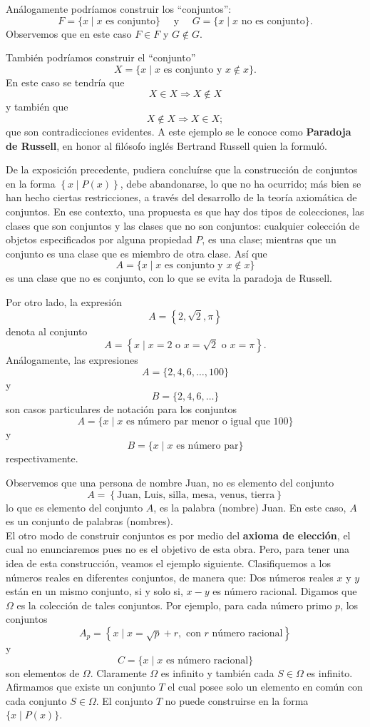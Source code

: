Análogamente podríamos construir los ``conjuntos'':
$$F = \{x \mid x \text{ es conjunto}\} \quad \text{ y } \quad G = \{x \mid x \text{ no es conjunto}\}.$$
Observemos que en este caso $F \in F$ y $G \notin G$.

También podríamos construir el ``conjunto''
$$X = \{x \mid x \text{ es conjunto y } x \notin x\}.$$
En este caso se tendría que
$$X \in X \Longrightarrow X \notin X$$
y también que
$$X \notin X \Longrightarrow X \in X;$$
que son contradicciones evidentes. A este ejemplo se le conoce como \textbf{Paradoja de Russell}, en honor al filósofo inglés Bertrand Russell quien la formuló.

De la exposición precedente, pudiera concluírse que la construcción de conjuntos en la forma $\left\{x \mid P(x) \right\}$, debe abandonarse, lo que no ha ocurrido; más bien se han hecho ciertas restricciones, a través del desarrollo de la teoría axiomática de conjuntos. En ese contexto, una propuesta es que hay dos tipos de colecciones, las clases que son conjuntos y las clases que no son conjuntos: cualquier colección de objetos especificados por alguna propiedad $P$, es una clase; mientras que un conjunto es una clase que es miembro de otra clase. Así que
$$A = \{x \mid x \text{ es conjunto y } x \notin x\}$$
es una clase que no es conjunto, con lo que se evita la paradoja de Russell.

Por otro lado, la expresión
$$A = \left\{2, \sqrt{2}, \pi \right\}$$
denota al conjunto
$$A = \left\{x \mid x = 2 \text { o } x = \sqrt{2} \text { o } x = \pi \right\}.$$
Análogamente, las expresiones
$$A = \{2, 4, 6, \dots, 100\}$$
y
$$B = \{2, 4, 6, \dots\}$$
son casos particulares de notación para los conjuntos
$$A = \{x \mid x \text { es número par menor o igual que } 100\}$$
y
$$B = \{x \mid x \text { es número par}\}$$
respectivamente.

Observemos que una persona de nombre Juan, no es elemento del conjunto
$$A = \left\{\text {Juan, Luis, silla, mesa, venus, tierra}\right\}$$\newpage\noindent
lo que es elemento del conjunto $A$, es la palabra (nombre) Juan. En este caso, $A$ es un conjunto de palabras (nombres). \\

El otro modo de construir conjuntos es por medio del \textbf{axioma de elección}, el cual no enunciaremos pues no es el objetivo de esta obra. Pero, para tener una idea de esta construcción, veamos el ejemplo siguiente. Clasifiquemos a los números reales en diferentes conjuntos, de manera que: Dos números reales $x$ y $y$ están en un mismo conjunto, si y solo si, $x - y$ es número racional. Digamos que $\Omega$ es la colección de tales conjuntos. Por ejemplo, para cada número primo $p$, los conjuntos
$$A_p = \left\{x \mid x = \sqrt{p}+r, \text { con } r \text { número racional} \right\}$$
y
$$C = \{x \mid x \text{ es número racional}\}$$
son elementos de $\Omega$. Claramente $\Omega$ es infinito y también cada $S \in \Omega$ es infinito. Afirmamos que existe un conjunto $T$ el cual posee solo un elemento en común con cada conjunto $S \in \Omega$. El conjunto $T$ no puede construirse en la forma $\{x \mid P(x)\}$.

